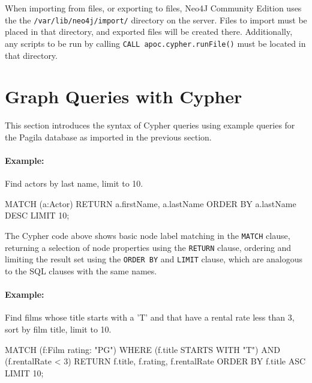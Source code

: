 \begin{tcolorbox}[colback=alert]
When importing from files, or exporting to files, Neo4J Community Edition uses the the \texttt{/var/lib/neo4j/import/} directory on the server. Files to import must be placed in that directory, and exported files will be created there. Additionally, any scripts to be run by calling \texttt{CALL apoc.cypher.runFile()} must be located in that directory.
\end{tcolorbox}

\section{Graph Queries with Cypher}

This section introduces the syntax of Cypher queries using example queries for the Pagila database as imported in the previous section.

\paragraph*{Example:}
Find actors by last name, limit to 10.

\begin{samepage}
\begin{cyphercode}
MATCH (a:Actor) 
RETURN a.firstName, a.lastName
ORDER BY a.lastName DESC
LIMIT 10;
\end{cyphercode}
\end{samepage}

The Cypher code above shows basic node label matching in the \texttt{MATCH} clause, returning a selection of node properties using the \texttt{RETURN} clause, ordering and limiting the result set using the \texttt{ORDER BY} and \texttt{LIMIT} clause, which are analogous to the SQL clauses with the same names.

\paragraph*{Example:} Find films whose title starts with a 'T' and that have a rental rate less than 3, sort by film title, limit to 10.

\begin{samepage}
\begin{cyphercode}
MATCH (f:Film {rating: "PG"})
WHERE (f.title STARTS WITH "T") AND (f.rentalRate < 3)
RETURN f.title, f.rating, f.rentalRate
ORDER BY f.title ASC LIMIT 10;
\end{cyphercode}
\end{samepage}

